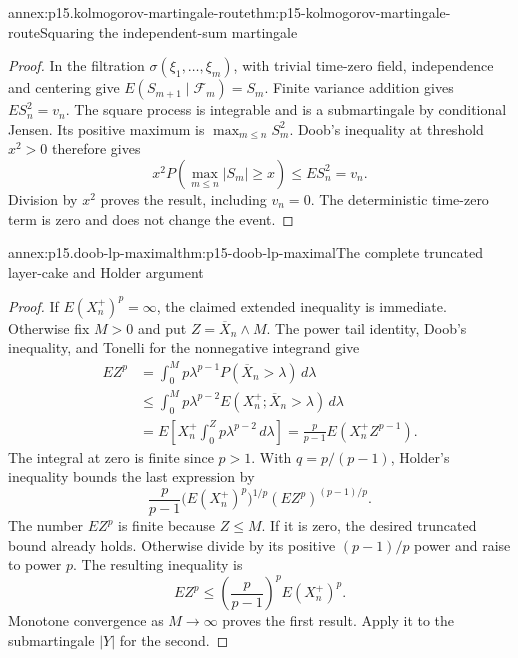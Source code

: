\begin{annexitem}{annex:p15.kolmogorov-martingale-route}{thm:p15-kolmogorov-martingale-route}{Squaring the independent-sum martingale}
\begin{proof}
In the filtration \(\sigma(\xi_1,\ldots,\xi_m)\), with trivial
time-zero field, independence and centering give
\(E(S_{m+1}\mid\mathcal F_m)=S_m\).
Finite variance addition gives \(ES_n^2=v_n\).
The square process is integrable and is a submartingale by
conditional Jensen. Its positive maximum is
\(\max_{m\leq n}S_m^2\). Doob's inequality at threshold \(x^2>0\)
therefore gives
\[
             x^2P(\max_{m\leq n}|S_m|\geq x)\leq ES_n^2=v_n.
\]
Division by \(x^2\) proves the result, including \(v_n=0\).
The deterministic time-zero term is zero and does not change the event.
\end{proof}
\end{annexitem}

\begin{annexitem}{annex:p15.doob-lp-maximal}{thm:p15-doob-lp-maximal}{The complete truncated layer-cake and Holder argument}
\begin{proof}
If \(E(X_n^+)^p=\infty\), the claimed extended inequality is immediate.
Otherwise fix \(M>0\) and put \(Z=\overline X_n\wedge M\).
The power tail identity, Doob's inequality, and Tonelli for the
nonnegative integrand give
\[
 \begin{aligned}
 EZ^p
   &=\int_0^M p\lambda^{p-1}P(\overline X_n>\lambda)\,d\lambda\\
   &\leq\int_0^M p\lambda^{p-2}
                          E(X_n^+;\overline X_n>\lambda)\,d\lambda\\
   &=E\left[X_n^+\int_0^Zp\lambda^{p-2}\,d\lambda\right]
     =\frac p{p-1}E(X_n^+Z^{p-1}).
 \end{aligned}
\]
The integral at zero is finite since \(p>1\).
With \(q=p/(p-1)\), Holder's inequality bounds the last expression by
\[
                    \frac p{p-1}
                         \bigl(E(X_n^+)^p\bigr)^{1/p}
                         (EZ^p)^{(p-1)/p}.
\]
The number \(EZ^p\) is finite because \(Z\leq M\).
If it is zero, the desired truncated bound already holds.
Otherwise divide by its positive \((p-1)/p\) power and raise
to power \(p\). The resulting inequality is
\[
                         EZ^p\leq
                              \left(\frac p{p-1}\right)^pE(X_n^+)^p.
\]
Monotone convergence as \(M\to\infty\) proves the first result.
Apply it to the submartingale \(|Y|\) for the second.
\end{proof}
\end{annexitem}

